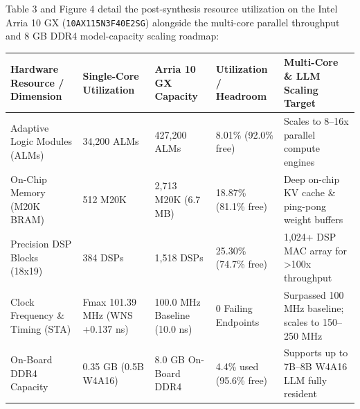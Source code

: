 \documentclass[11pt,a4paper]{article}
\begin{document}
Table 3 and Figure 4 detail the post-synthesis resource utilization on the Intel Arria 10 GX (\texttt{10AX115N3F40E2SG}) alongside the multi-core parallel throughput and 8 GB DDR4 model-capacity scaling roadmap:

{\footnotesize\renewcommand{\arraystretch}{1.14}\begin{longtable}{@{}L{0.21\textwidth}L{0.16\textwidth}L{0.16\textwidth}L{0.15\textwidth}L{0.22\textwidth}@{}}\toprule

\textbf{Hardware Resource /\allowbreak{} Dimension} & \textbf{Single-Core Utilization} & \textbf{Arria 10 GX Capacity} & \textbf{Utilization /\allowbreak{} Headroom} & \textbf{Multi-Core \& LLM Scaling Target}\\\midrule\endhead

Adaptive Logic Modules (\allowbreak{}ALMs)\allowbreak{} & 34,\allowbreak{}200 ALMs & 427,\allowbreak{}200 ALMs & 8.01\% (\allowbreak{}92.0\% free)\allowbreak{} & Scales to 8--16x parallel compute engines\\[2pt]

On-Chip Memory (\allowbreak{}M20K BRAM)\allowbreak{} & 512 M20K & 2,\allowbreak{}713 M20K (\allowbreak{}6.7 MB)\allowbreak{} & 18.87\% (\allowbreak{}81.1\% free)\allowbreak{} & Deep on-chip KV cache \& ping-pong weight buffers\\[2pt]

Precision DSP Blocks (\allowbreak{}18x19)\allowbreak{} & 384 DSPs & 1,\allowbreak{}518 DSPs & 25.30\% (\allowbreak{}74.7\% free)\allowbreak{} & 1,\allowbreak{}024+\allowbreak{} DSP MAC array for >100x throughput\\[2pt]

Clock Frequency \& Timing (\allowbreak{}STA)\allowbreak{} & Fmax 101.39 MHz (\allowbreak{}WNS +\allowbreak{}0.137 ns)\allowbreak{} & 100.0 MHz Baseline (\allowbreak{}10.0 ns)\allowbreak{} & 0 Failing Endpoints & Surpassed 100 MHz baseline; scales to 150--250 MHz\\[2pt]

On-Board DDR4 Capacity & 0.35 GB (\allowbreak{}0.5B W4A16)\allowbreak{} & 8.0 GB On-Board DDR4 & 4.4\% used (\allowbreak{}95.6\% free)\allowbreak{} & Supports up to 7B--8B W4A16 LLM fully resident\\[2pt]

\bottomrule\end{longtable}}
\end{document}
